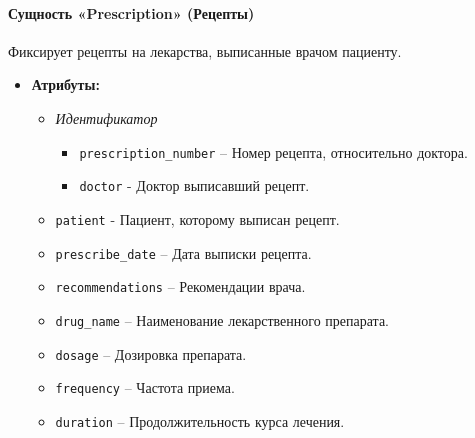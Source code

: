 \documentclass[a4paper, 14pt]{extarticle}
\begin{document}
\paragraph{Сущность «Prescription» (Рецепты)}
Фиксирует рецепты на лекарства, выписанные врачом пациенту.
\begin{itemize}
    \item \textbf{Атрибуты:}
    \begin{itemize}
        \item \textit{Идентификатор}
            \begin{itemize}
                \item \texttt{prescription\_number} – Номер рецепта, относительно доктора.
                \item \texttt{doctor} - Доктор выписавший рецепт.
            \end{itemize}
        \item \texttt{patient} - Пациент, которому выписан рецепт.
        \item \texttt{prescribe\_date} – Дата выписки рецепта.
        \item \texttt{recommendations} – Рекомендации врача.
        \item \texttt{drug\_name} – Наименование лекарственного препарата.
        \item \texttt{dosage} – Дозировка препарата.
        \item \texttt{frequency} – Частота приема.
        \item \texttt{duration} – Продолжительность курса лечения.
    \end{itemize}
\end{itemize}
\end{document}
